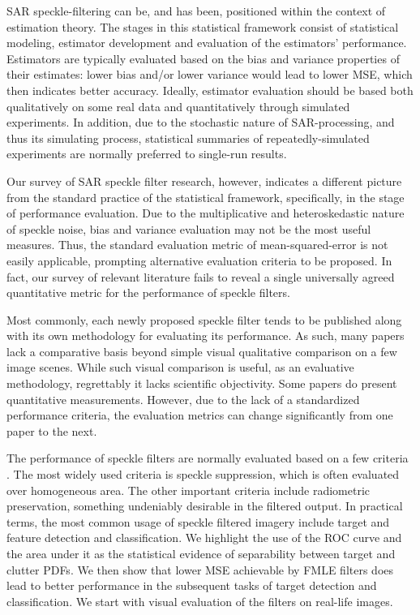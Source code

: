 SAR speckle-filtering can be, and has been, positioned within the context of estimation theory\cite{Touzi_2002_TGRS}. 
The stages in this statistical framework consist of statistical modeling, estimator development and evaluation of the estimators' performance. 
Estimators are typically evaluated based on the bias and variance properties of their estimates:
  lower bias and/or lower variance would lead to lower MSE, which then indicates better accuracy.
Ideally, estimator evaluation should be based both qualitatively on some real data and quantitatively through simulated experiments. 
In addition, due to the stochastic nature of SAR-processing, and thus its simulating process, 
	statistical summaries of repeatedly-simulated experiments are normally preferred to single-run results.

Our survey of SAR speckle filter research, however, indicates 
	a different picture from the standard practice of the statistical framework, 
	specifically, in the stage of performance evaluation. 
Due to the multiplicative and heteroskedastic nature of speckle noise, 
	bias and variance evaluation may not be the most useful measures. 
Thus, the standard evaluation metric of mean-squared-error is not easily applicable,
	prompting alternative evaluation criteria to be proposed.
In fact, our survey of relevant literature fails to reveal 
	a single universally agreed quantitative metric for the performance of speckle filters.

Most commonly, each newly proposed speckle filter tends to be published along with its own methodology for evaluating its 
	performance. 
As such, many papers lack a comparative basis beyond simple visual qualitative comparison on a few image scenes. 
While such visual comparison is useful, as an evaluative methodology, regrettably it lacks scientific objectivity. 
Some papers do present quantitative measurements. 
However, due to the lack of a standardized performance criteria, 
	the evaluation metrics can change significantly from one paper to the next.

The performance of speckle filters are normally evaluated based on a few criteria \citep{Nyoungui_2002_IntlJRemoteSense}.
The most widely used criteria is speckle suppression, 
  which is often evaluated over homogeneous area.
The other important criteria include radiometric preservation, something undeniably desirable in the filtered output.
In practical terms, the most common usage of speckle filtered imagery include target and feature detection and classification.
We highlight the use of the ROC curve and the area under it as the statistical evidence of separability between target and clutter PDFs.
We then show that lower MSE achievable by FMLE filters does lead to better performance in the subsequent tasks of target detection and classification.
We start with visual evaluation of the filters on real-life images.

